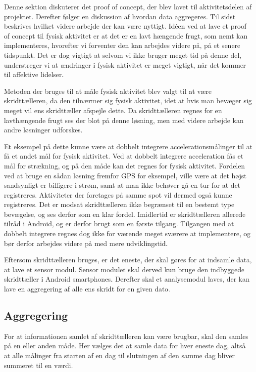 Denne sektion diskuterer det proof of concept, der blev lavet til aktivitetsdelen af projektet. 
Derefter følger en diskussion af hvordan data aggregeres.
Til sidst beskrives hvilket videre arbejde der kan være nyttigt. 
Idéen ved at lave et proof of concept til fysisk aktivitet er at det er en lavt hængende frugt, som nemt kan implementeres, hvorefter vi forventer den kan arbejdes videre på, på et senere tidspunkt. 
Det er dog vigtigt at selvom vi ikke bruger meget tid på denne del, understreger vi at ændringer i fysisk aktivitet er meget vigtigt, når det kommer til affektive lidelser. 

Metoden der bruges til at måle fysisk aktivitet blev valgt til at være skridttælleren, da den tilnærmer sig fysisk aktivitet, idet at hvis man bevæger sig meget vil ens skridttæller afspejle dette.
Da skridttælleren regnes for en lavthængende frugt ses der blot på denne løsning, men med videre arbejde kan andre løsninger udforskes.

Et eksempel på dette kunne være at dobbelt integrere accelerationsmålinger til at få et andet mål for fysisk aktivitet.
Ved at dobbelt integrere acceleration fås et mål for strækning, og på den måde kan det regnes for fysisk aktivitet.
Fordelen ved at bruge en sådan løsning fremfor GPS for eksempel, ville være at det højst sandsynligt er billigere i strøm, samt at man ikke behøver gå en tur for at det registreres. Aktiviteter der foretages på samme spot vil dermed også kunne registreres.
Det er modsat skridttælleren ikke begrænset til en bestemt type bevægelse, og ses derfor som en klar fordel.
Imidlertid er skridttælleren allerede tilråd i Android, og er derfor brugt som en første tilgang.
Tilgangen med at dobbelt integrere regnes dog ikke for værende meget sværere at implementere, og bør derfor arbejdes videre på med mere udviklingstid.

Eftersom skridttælleren bruges, er det eneste, der skal gøres for at indsamle data, at lave et sensor modul.
Sensor modulet skal derved kun bruge den indbyggede skridttæller i Android smartphones.
Derefter skal et analysemodul laves, der kan lave en aggregering af alle ens skridt for en given dato.

\subsection{Aggregering}
For at informationen samlet af skridttælleren kan være brugbar, skal den samles på en eller anden måde.
Her vælges det at samle data for hver eneste dag, altså at alle målinger fra starten af en dag til slutningen af den samme dag bliver summeret til en værdi.

